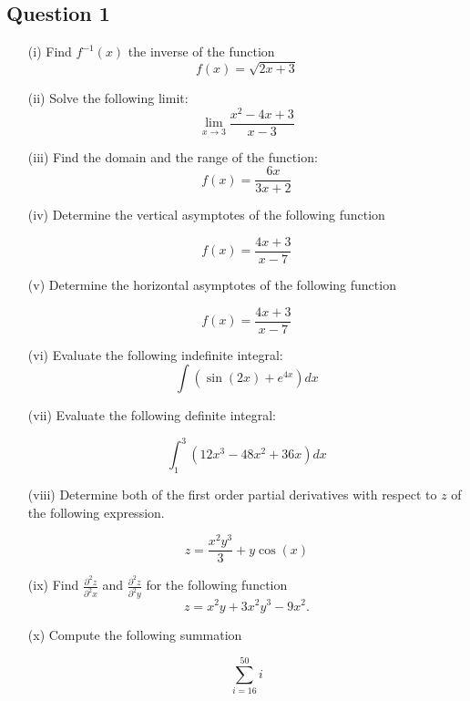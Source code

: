 \documentclass[a4paper,12pt]{article}
\begin{document}
\subsection*{Question 1}
\begin{itemize}

	\item[(i)] Find $f^{-1}(x)$ the inverse of the function
	\[f(x) = \sqrt{2x+3} \]
	
	\item[(ii)]	Solve the following limit:
	\[\lim_{x \to 3 } \frac{x^2-4x +3}{x-3}\]
	
	\item[(iii)] Find the domain and the range of the function:
	\[ f(x) = \frac{6x}{3x+2} \]


\item[(iv)] Determine the vertical asymptotes of the following function

\[  f(x)  = \frac{4x+3}{x-7} \]



\item[(v)]	Determine the horizontal asymptotes of the following function

\[  f(x)  = \frac{4x+3}{x-7} \]







\item[(vi)] Evaluate the following indefinite integral:
\[ \int (\sin(2x)+e^{4x}) dx   \]
\item[(vii)] Evaluate the following definite integral:

\[  \int^3_1 (12x^3 -48x^2 +36x) dx \]

\item[(viii)] Determine both of the first order partial derivatives with respect to $z$ of the following expression.

\[ z = \frac{x^2y^3}{3} +  y \cos(x)\]
 

	\item[(ix)] Find $\displaystyle{ \frac{ \partial^2 z }{ \partial^2 x  }}$ and $\displaystyle{ \frac{ \partial^2 z }{ \partial^2 y }}$  for the following function
	\[ z = x^2y + 3x^2y^3 - 9x^2.\]	
	
	

\item[(x)]  Compute the following summation

\[ \sum_{i=16}^{50} i \]
\end{itemize}
\end{document}
